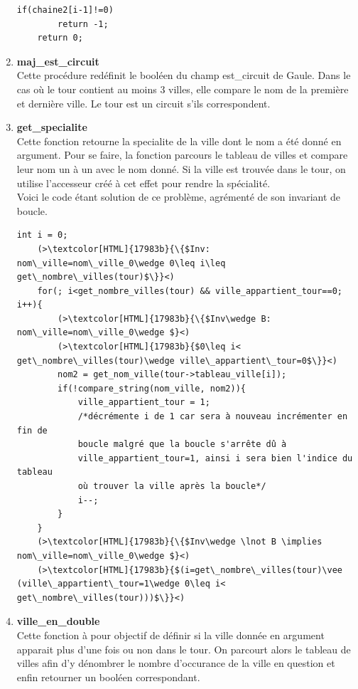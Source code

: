 \documentclass[a4paper, 11pt, oneside]{article}
\begin{document}
\begin{enumerate}
\begin{lstlisting}[caption = {code comparaison de 2 chaines de caractères}]
    if(chaine2[i-1]!=0)
        return -1;
    return 0;
    \end{lstlisting}
    \item \textbf{maj\_est\_circuit}
    \\Cette procédure redéfinit le booléen du champ est\_circuit de Gaule. Dans le cas où le tour contient
    au moins 3 villes, elle compare le nom de la première et dernière ville. Le tour est un circuit s'ils 
    correspondent.
    \item \textbf{get\_specialite}
    \\Cette fonction retourne la specialite de la ville dont le nom a été donné en argument. Pour se faire, 
    la fonction parcours le tableau de villes et compare leur nom un à un avec le nom donné. Si la 
    ville est trouvée dans le tour, on utilise l'accesseur créé à cet effet pour rendre la spécialité.
    \\Voici le code étant solution de ce problème, agrémenté de son invariant de boucle.
    \begin{lstlisting}[caption = {code boucle trouver ville correspondante}]
    int i = 0;
    (>\textcolor[HTML]{17983b}{\{$Inv: nom\_ville=nom\_ville_0\wedge 0\leq i\leq get\_nombre\_villes(tour)$\}}<)
    for(; i<get_nombre_villes(tour) && ville_appartient_tour==0; i++){
        (>\textcolor[HTML]{17983b}{\{$Inv\wedge B: nom\_ville=nom\_ville_0\wedge $}<)
        (>\textcolor[HTML]{17983b}{$0\leq i< get\_nombre\_villes(tour)\wedge ville\_appartient\_tour=0$\}}<)
        nom2 = get_nom_ville(tour->tableau_ville[i]);
        if(!compare_string(nom_ville, nom2)){
            ville_appartient_tour = 1;
            /*décrémente i de 1 car sera à nouveau incrémenter en fin de 
            boucle malgré que la boucle s'arrête dû à 
            ville_appartient_tour=1, ainsi i sera bien l'indice du tableau 
            où trouver la ville après la boucle*/
            i--;
        }
    }    
    (>\textcolor[HTML]{17983b}{\{$Inv\wedge \lnot B \implies nom\_ville=nom\_ville_0\wedge $}<)
    (>\textcolor[HTML]{17983b}{$(i=get\_nombre\_villes(tour)\vee (ville\_appartient\_tour=1\wedge 0\leq i< get\_nombre\_villes(tour)))$\}}<)
    \end{lstlisting}
    \item \textbf{ville\_en\_double}
    \\Cette fonction à pour objectif de définir si la ville donnée en argument apparait plus d'une fois 
    ou non dans le tour. On parcourt alors le tableau de villes afin d'y dénombrer le nombre d'occurance
    de la ville en question et enfin retourner un booléen correspondant.

\end{enumerate}
\end{document}
